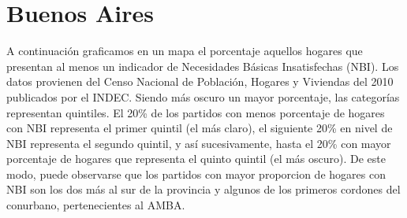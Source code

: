 \documentclass[9pt]{article}
\begin{document}
\section{Buenos Aires}

A continuaci\'on graficamos en un mapa el porcentaje aquellos hogares que presentan al menos un indicador de Necesidades B\'asicas Insatisfechas (NBI). Los datos provienen del Censo Nacional de Población, Hogares y Viviendas del 2010 publicados por el INDEC. Siendo m\'as oscuro un mayor porcentaje, las categorías representan quintiles. El 20\% de los partidos con menos porcentaje de hogares con NBI representa el primer quintil (el m\'as claro), el siguiente 20\% en nivel de NBI representa el segundo quintil, y así sucesivamente, hasta el 20\% con mayor porcentaje de hogares que representa el quinto quintil (el m\'as oscuro). De este modo, puede observarse que los partidos con mayor proporcion de hogares con NBI son los dos m\'as al sur de la provincia y algunos de los primeros cordones del conurbano, pertenecientes al AMBA. 
\end{document}
